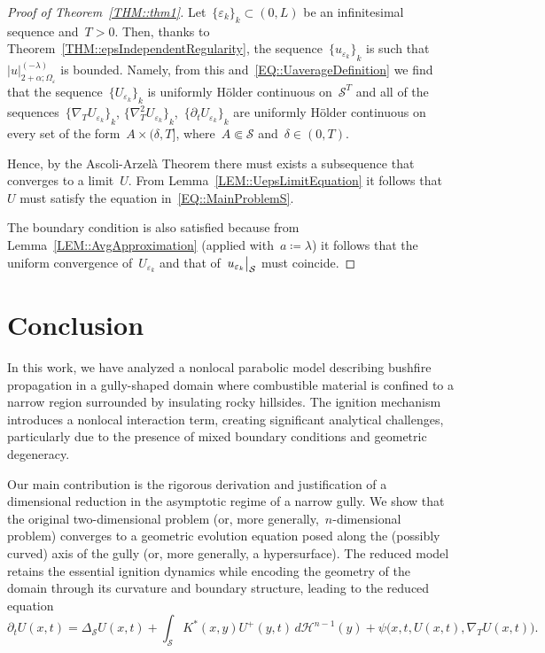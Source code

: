 \documentclass[12pt,a4paper]{amsart}
\numberwithin{equation}{section}
\theoremstyle{definition}
\theoremstyle{remark}
\newcommand{\eps}{\varepsilon}
\newcommand{\abs}[1]{\left\lvert#1\right\rvert}
\newcommand{\restr}[2]{{\left.\kern-\nulldelimiterspace#1\vphantom{\big|}\right|_{#2}}}
\begin{document}
\begin{proof}[Proof of Theorem~\ref{THM::thm1}]
    Let~${\{\eps_k\}}_k \subset (0,L)$ be an infinitesimal sequence and~$T>0$. Then, thanks to Theorem~\ref{THM::epsIndependentRegularity}, the sequence~${\{u_{\eps_k}\}}_k$ is such that~$\abs{u}_{2+\alpha; \Omega_\eps}^{(-\lambda)}$ is bounded. Namely, from this and~\eqref{EQ::UaverageDefinition} we find that the sequence~${\{U_{\eps_k}\}}_k$ is uniformly Hölder continuous on~$\mathcal{S}^T$ and all of the sequences~${\{\nabla_T U_{\eps_k}\}}_k$, ${\{\nabla_T^2 U_{\eps_k}\}}_k$,~${\{\partial_t U_{\eps_k}\}}_k$ are uniformly Hölder continuous on every set of the form~$A \times (\delta,T]$, where~$A \Subset \mathcal{S}$ and~$\delta \in (0,T)$. %
    
    Hence, by the Ascoli-Arzelà Theorem there must exists a subsequence that converges to a limit~$U$. From Lemma~\eqref{LEM::UepsLimitEquation} it follows that~$U$ must satisfy the equation in~\eqref{EQ::MainProblemS}.
    
    The boundary condition is also satisfied because from Lemma~\ref{LEM::AvgApproximation} (applied with~$a \coloneq \lambda$) it follows that the uniform convergence of~$U_{\eps_k}$ and that of~$\restr{u_{\eps_k}}{\mathcal{S}}$ must coincide.
\end{proof}

\section{Conclusion}\label{SEC::Conclusion}

In this work, we have analyzed a nonlocal parabolic model describing bushfire propagation in a gully-shaped domain where combustible material is confined to a narrow region surrounded by insulating rocky hillsides. The ignition mechanism introduces a nonlocal interaction term, creating significant analytical challenges, particularly due to the presence of mixed boundary conditions and geometric degeneracy.

Our main contribution is the rigorous derivation and justification of a dimensional reduction in the asymptotic regime of a narrow gully. We show that the original two-dimensional problem (or, more generally,~$n$-dimensional problem) converges to a geometric evolution equation posed along the (possibly curved) axis of the gully (or, more generally, a hypersurface). The reduced model retains the essential ignition dynamics while encoding the geometry of the domain through its curvature and boundary structure, leading to the reduced equation
\[\partial_t U(x,t) = \Delta_{\mathcal{S}}U(x,t) + \int_{\mathcal{S}} K^\ast(x,y)U^+(y,t)\,d\mathcal{H}^{n-1}(y) + \psi\big(x,t,U(x,t),\nabla_T U(x,t)\big).\]
\end{document}
